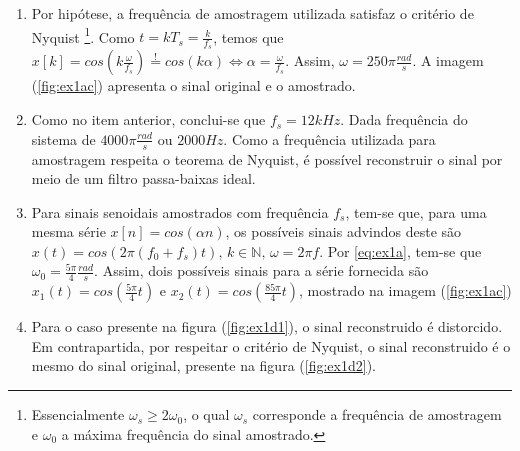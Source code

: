 \documentclass[twoside, fleqn]{article}
\begin{document}
    \begin{enumerate}

        \item %
        
        Por hipótese, a frequência de amostragem utilizada satisfaz o critério de Nyquist \footnote{Essencialmente $\omega_s \geq 2\omega_0$, o qual $\omega_s$ corresponde a frequência de amostragem e $\omega_0$ a máxima frequência do sinal amostrado.}. Como $t = kT_s = \frac{k}{f_s}$, temos que $x[k] = cos(k \frac{\omega}{f_s})  \stackrel{!}{=} cos(k \alpha) \Longleftrightarrow \alpha = \frac{\omega}{f_s}$. Assim, $\omega = 250\pi \frac{rad}{s}$. A imagem (\ref{fig:ex1ac}) apresenta o sinal original e o amostrado.
        
        \item %
        
        Como no item anterior, conclui-se que $f_s = 12 kHz$. Dada frequência do sistema de $4000\pi \frac{rad}{s}$ ou $2000 Hz$. Como a frequência utilizada para amostragem respeita o teorema de Nyquist, é possível reconstruir o sinal por meio de um filtro passa-baixas ideal. 
        
        \item %
        Para sinais senoidais amostrados com frequência $f_s$, tem-se que, para uma mesma série $x[n] = cos(\alpha n)$, os possíveis sinais advindos deste são $x(t) = cos(2 \pi (f_0 + f_s)t) \mbox{, } k \in \mathbb{N} \mbox{, } \omega = 2 \pi f$. Por \eqref{eq:ex1a}, tem-se que $\omega_0 = \frac{5\pi}{4} \frac{rad}{s}$. Assim, dois possíveis sinais para a série fornecida são $x_1(t) = cos(\frac{5\pi}{4} t )$ e $x_2(t) = cos(\frac{85\pi}{4} t)$, mostrado na imagem (\ref{fig:ex1ac}) 
        
        \item %
        
        Para o caso presente na figura (\ref{fig:ex1d1}), o sinal reconstruido é distorcido. Em contrapartida, por respeitar o critério de Nyquist, o sinal reconstruido é o mesmo do sinal original, presente na figura (\ref{fig:ex1d2}).
        
        \newpage


\end{enumerate}
\end{document}
